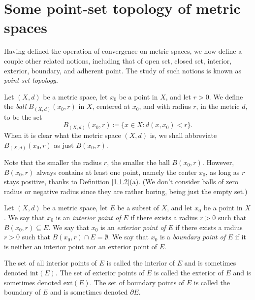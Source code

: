\section{Some point-set topology of metric spaces}\label{sec 1.2}

\begin{note}
    Having defined the operation of convergence on metric spaces, we now define a couple other related notions, including that of open set, closed set, interior, exterior, boundary, and adherent point.
    The study of such notions is known as \emph{point-set topology}.
\end{note}

\begin{definition}[Balls]\label{1.2.1}
    Let \((X, d)\) be a metric space, let \(x_0\) be a point in \(X\), and let \(r > 0\).
    We define the \emph{ball} \(B_{(X, d)}(x_0, r)\) in \(X\), centered at \(x_0\), and with radius \(r\), in the metric \(d\), to be the set
    \[
        B_{(X, d)}(x_0, r) \coloneqq \{x \in X : d(x, x_0) < r\}.
    \]
    When it is clear what the metric space \((X, d)\) is, we shall abbreviate \(B_{(X, d)}(x_0, r)\) as just \(B(x_0, r)\).
\end{definition}

\setcounter{theorem}{3}
\begin{remark}\label{1.2.4}
    Note that the smaller the radius \(r\), the smaller the ball \(B(x_0 , r)\).
    However, \(B(x_0 , r)\) always contains at least one point, namely the center \(x_0\), as long as \(r\) stays positive, thanks to Definition \ref{1.1.2}(a).
    (We don't consider balls of zero radius or negative radius since they are rather boring, being just the empty set.)
\end{remark}

\begin{definition}\label{1.2.5}
    Let \((X, d)\) be a metric space, let \(E\) be a subset of \(X\), and let \(x_0\) be a point in \(X\).
    We say that \(x_0\) is an \emph{interior point of} \(E\) if there exists a radius \(r > 0\) such that \(B(x_0, r) \subseteq E\).
    We say that \(x_0\) is an \emph{exterior point of} \(E\) if there exists a radius \(r > 0\) such that \(B(x_0, r) \cap E = \emptyset\).
    We say that \(x_0\) is a \emph{boundary point of} \(E\) if it is neither an interior point nor an exterior point of \(E\).
\end{definition}

\begin{note}
    The set of all interior points of \(E\) is called the interior of \(E\) and is sometimes denoted \(\text{int}(E)\).
    The set of exterior points of \(E\) is called the exterior of \(E\) and is sometimes denoted \(\text{ext}(E)\).
    The set of boundary points of \(E\) is called the boundary of \(E\) and is sometimes denoted \(\partial E\).
\end{note}


